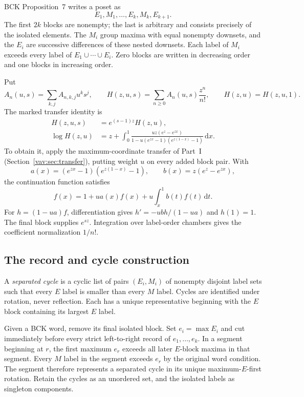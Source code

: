 \documentclass[11pt]{article}
\theoremstyle{remark}\newtheorem{remark}[theorem]{Remark}
\newcommand{\dd}{\,\mathrm d}
\begin{document}
BCK Proposition~7 writes a poset as
\[
 E_1,M_1,\ldots,E_k,M_k,E_{k+1}.
\]
The first $2k$ blocks are nonempty; the last is arbitrary and consists precisely of the isolated elements. The $M_i$ group maxima with equal nonempty downsets, and the $E_i$ are successive differences of these nested downsets. Each label of $M_i$ exceeds every label of $E_1\cup\cdots\cup E_i$. Zero blocks are written in decreasing order and one blocks in increasing order.

Put
\[
 A_n(u,s)=\sum_{k,j}A_{n,k,j}u^ks^j,\qquad
 H(z,u,s)=\sum_{n\ge0}A_n(u,s)\frac{z^n}{n!},\qquad H(z,u)=H(z,u,1).
\]
The marked transfer identity is
\begin{align}
 H(z,u,s)&=e^{(s-1)z}H(z,u),\label{vav:rf:eq:iso}\\
 \log H(z,u)&=z+\int_0^1
 \frac{uz(e^z-e^{zx})}{1-u(e^{zx}-1)(e^{z(1-x)}-1)}\dd x.\label{vav:rf:eq:exact}
\end{align}
To obtain it, apply the maximum-coordinate transfer of Part~I (Section~\ref{vav:sec:transfer}), putting weight $u$ on every added block pair. With
\[
 a(x)=(e^{zx}-1)(e^{z(1-x)}-1),\qquad b(x)=z(e^z-e^{zx}),
\]
the continuation function satisfies
\[
 f(x)=1+u a(x)f(x)+u\int_x^1 b(t)f(t)\dd t.
\]
For $h=(1-ua)f$, differentiation gives $h'=-ub h/(1-ua)$ and $h(1)=1$. The final block supplies $e^{sz}$. Integration over label-order chambers gives the coefficient normalization $1/n!$.

\subsection{The record and cycle construction}\label{vav:rf:sec:bijection}
A \emph{separated cycle} is a cyclic list of pairs $(E_i,M_i)$ of nonempty disjoint label sets such that every $E$ label is smaller than every $M$ label. Cycles are identified under rotation, never reflection. Each has a unique representative beginning with the $E$ block containing its largest $E$ label.

Given a BCK word, remove its final isolated block. Set $e_i=\max E_i$ and cut immediately before every strict left-to-right record of $e_1,\ldots,e_k$. In a segment beginning at $r$, the first maximum $e_r$ exceeds all later $E$-block maxima in that segment. Every $M$ label in the segment exceeds $e_r$ by the original word condition. The segment therefore represents a separated cycle in its unique maximum-$E$-first rotation. Retain the cycles as an unordered set, and the isolated labels as singleton components.
\end{document}
